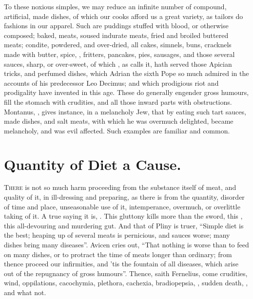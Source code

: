 To these noxious simples, we may reduce an infinite number of compound,
artificial, made dishes, of which our cooks afford us a great variety, as
tailors do fashions in our apparel. Such are puddings
stuffed with blood, or otherwise composed; baked, meats, soused indurate meats,
fried and broiled buttered meats; condite, powdered, and over-dried,
all cakes, simnels, buns, cracknels made with butter,
spice, \etc{}, fritters, pancakes, pies, sausages, and those several sauces,
sharp, or over-sweet, of which , as \Seneca{} calls it, hath
served those Apician tricks, and perfumed dishes, which
Adrian the sixth Pope so much admired in the accounts of his predecessor Leo
Decimus; and which prodigious riot and prodigality have invented in this age.
These do generally engender gross humours, fill the stomach with crudities, and
all those inward parts with obstructions. Montanus,
, gives instance, in a melancholy Jew, that by
eating such tart sauces, made dishes, and salt meats, with which he was
overmuch delighted, became melancholy, and was evil affected. Such examples are
familiar and common.

\section{Quantity of Diet a Cause.}

\lettrine{T}{here} is not so much harm proceeding from the substance itself of
meat, and quality of it, in ill-dressing and preparing, as there is from the
quantity, disorder of time and place, unseasonable use of it,
intemperance, overmuch, or overlittle taking of it. A true
saying it is, . This gluttony kills more than
the sword, this , this all-devouring and
murdering gut. And that of Pliny is truer, \enquote{Simple diet is
the best; heaping up of several meats is pernicious, and sauces worse; many
dishes bring many diseases}. Avicen cries out, \enquote{That
nothing is worse than to feed on many dishes, or to protract the time of meats
longer than ordinary; from thence proceed our infirmities, and 'tis the
fountain of all diseases, which arise out of the repugnancy of gross humours}.
Thence, saith Fernelius, come crudities, wind,
oppilations, cacochymia, plethora, cachexia, bradiopepsia,
,
sudden death, \etc{}, and what not.

